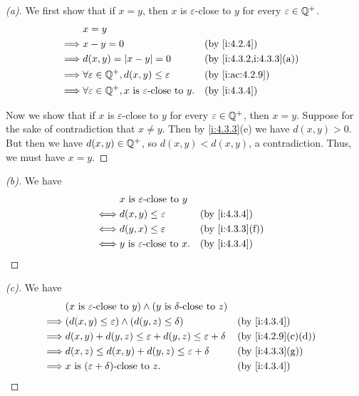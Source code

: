 \begin{proof}[(a)]
  We first show that if \(x = y\), then \(x\) is \(\varepsilon\)-close to \(y\) for every \(\varepsilon \in \mathbb{Q}^+\).
  \begin{align*}
             & x = y                                                                                                \\
    \implies & x - y = 0                                                               &  & \by{i:4.2.4}            \\
    \implies & d(x, y) = \abs{x - y} = 0                                               &  & \by{i:4.3.2,i:4.3.3}[a] \\
    \implies & \forall \varepsilon \in \Q^+, d(x, y) \leq \varepsilon                  &  & \by{i:ac:4.2.9}         \\
    \implies & \forall \varepsilon \in \Q^+, x \text{ is \(\varepsilon\)-close to } y. &  & \by{i:4.3.4}
  \end{align*}

  Now we show that if \(x\) is \(\varepsilon\)-close to \(y\) for every \(\varepsilon \in \mathbb{Q}^+\), then \(x = y\).
  Suppose for the sake of contradiction that \(x \neq y\).
  Then by \cref{i:4.3.3}(e) we have \(d(x, y) > 0\).
  But then we have \(d(x, y) \in \mathbb{Q}^+\), so \(d(x, y) < d(x, y)\), a contradiction.
  Thus, we must have \(x = y\).
\end{proof}

\begin{proof}[(b)]
  We have
  \begin{align*}
         & x \text{ is \(\varepsilon\)-close to } y                       \\
    \iff & d(x, y) \leq \varepsilon                  &  & \by{i:4.3.4}    \\
    \iff & d(y, x) \leq \varepsilon                  &  & \by{i:4.3.3}[f] \\
    \iff & y \text{ is \(\varepsilon\)-close to } x. &  & \by{i:4.3.4}
  \end{align*}
\end{proof}

\begin{proof}[(c)]
  We have
  \begin{align*}
             & (x \text{ is \(\varepsilon\)-close to } y) \land (y \text{ is \(\delta\)-close to } z)                        \\
    \implies & \pa{d(x, y) \leq \varepsilon} \land \pa{d(y, z) \leq \delta}                           &  & \by{i:4.3.4}      \\
    \implies & d(x, y) + d(y, z) \leq \varepsilon + d(y, z) \leq \varepsilon + \delta                 &  & \by{i:4.2.9}[c,d] \\
    \implies & d(x, z) \leq d(x, y) + d(y, z) \leq \varepsilon + \delta                               &  & \by{i:4.3.3}[g]   \\
    \implies & x \text{ is \((\varepsilon + \delta)\)-close to } z.                                   &  & \by{i:4.3.4}
  \end{align*}
\end{proof}

